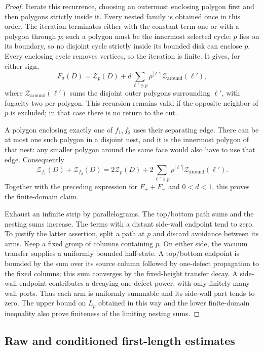 \begin{proof}
Iterate this recurrence, choosing an outermost enclosing polygon first
and then polygons strictly inside it. Every nested family is obtained
once in this order. The iteration terminates either with the constant
term one or with a polygon through \(p\); such a polygon must be the
innermost selected cycle: \(p\) lies on its boundary, so no disjoint
cycle strictly inside its bounded disk can enclose \(p\). Every enclosing cycle removes vertices,
so the iteration is finite. It gives, for either sign,
\[
 F_\sigma(D)=\mathcal Z_p(D)+d\sum_{\ell'\ni p}
       \rho^{|\ell'|}\mathcal Z_{\mathrm{around}}(\ell'),
\]
where $\mathcal Z_{\mathrm{around}}(\ell')$ sums the disjoint outer
polygons surrounding $\ell'$, with fugacity two per polygon. This
recursion remains valid if the opposite neighbor of $p$ is excluded;
in that case there is no return to the cut.

A polygon enclosing exactly one of $f_1,f_2$ uses their separating
edge. There can be at most one such polygon in a disjoint nest, and it
is the innermost polygon of that nest: any smaller polygon around the
same face would also have to use that edge. Consequently
\[
 \mathcal Z_{f_1}(D)+\mathcal Z_{f_2}(D)
 =2\mathcal Z_p(D)+2\sum_{\ell'\ni p}
       \rho^{|\ell'|}\mathcal Z_{\mathrm{around}}(\ell').
\]
Together with the preceding expression for $F_++F_-$ and $0<d<1$,
this proves the finite-domain claim.

Exhaust an infinite strip by parallelograms. The top/bottom path sums
and the nesting sums increase. The terms with a distant side-wall
endpoint tend to zero. To justify the latter assertion, split a path
at $p$ and discard avoidance between its arms. Keep a fixed group of
columns containing $p$. On either side, the vacuum transfer supplies
a uniformly bounded half-state. A top/bottom endpoint is bounded by
the sum over its source column followed by one-defect propagation to
the fixed columns; this sum converges by the fixed-height transfer
decay. A side-wall endpoint contributes a decaying one-defect power,
with only finitely many wall ports. Thus each arm is uniformly summable
and its side-wall part tends to zero. The upper bound on $L_p$ obtained
in this way and the lower finite-domain inequality also prove finiteness
of the limiting nesting sums.
\end{proof}


\subsection{Raw and conditioned first-length estimates}

